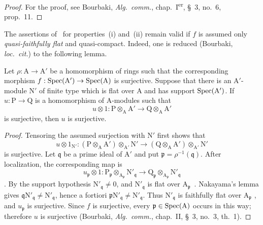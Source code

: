 \begin{proof}
For the proof, see Bourbaki, \emph{Alg.\ comm.}, chap.~I\textsuperscript{er}, \S~3, no.~6, prop.~11.
\end{proof}

\begin{remark}[2.5.4]
\label{IV.2.5.4}
The assertions of~ for properties~(i) and~(ii) remain
valid if $f$ is assumed only \emph{quasi-faithfully flat}
 and quasi-compact. Indeed, one is reduced (Bourbaki,
\emph{loc.\ cit.}) to the following lemma.
\end{remark}

\begin{lemma}[2.5.4.1]
\label{IV.2.5.4.1}
Let $\rho:\mathrm{A}\to\mathrm{A}'$ be a homomorphism of rings such that
the corresponding morphism
$f:\operatorname{Spec}(\mathrm{A}')\to\operatorname{Spec}(\mathrm{A})$ is surjective. Suppose that
there is an $\mathrm{A}'$-module $\mathrm{N}'$ of finite type which is
flat over $\mathrm{A}$ and has support $\operatorname{Spec}(\mathrm{A}')$. If
$u:\mathrm{P}\to\mathrm{Q}$ is a homomorphism of $\mathrm{A}$-modules
such that
\[
  u\otimes 1:
  \mathrm{P}\otimes_{\mathrm{A}}\mathrm{A}'
  \longrightarrow
  \mathrm{Q}\otimes_{\mathrm{A}}\mathrm{A}'
\]
is surjective, then $u$ is surjective.
\end{lemma}

\begin{proof}
Tensoring the assumed surjection with $\mathrm{N}'$ first shows that
\[
  u\otimes 1_{\mathrm{N}'}:
  (\mathrm{P}\otimes_{\mathrm{A}}\mathrm{A}')
    \otimes_{\mathrm{A}'}\mathrm{N}'
  \longrightarrow
  (\mathrm{Q}\otimes_{\mathrm{A}}\mathrm{A}')
    \otimes_{\mathrm{A}'}\mathrm{N}'
\]
is surjective. Let $\mathfrak{q}$ be a prime ideal of $\mathrm{A}'$ and
put $\mathfrak{p}=\rho^{-1}(\mathfrak{q})$. After localization, the
corresponding map is
\[
  u_{\mathfrak{p}}\otimes 1:
  \mathrm{P}_{\mathfrak{p}}
    \otimes_{\mathrm{A}_{\mathfrak{p}}}\mathrm{N}'_{\mathfrak{q}}
  \longrightarrow
  \mathrm{Q}_{\mathfrak{p}}
    \otimes_{\mathrm{A}_{\mathfrak{p}}}\mathrm{N}'_{\mathfrak{q}}
\]
. By the support hypothesis
$\mathrm{N}'_{\mathfrak{q}}\neq0$, and
$\mathrm{N}'_{\mathfrak{q}}$ is flat over
$\mathrm{A}_{\mathfrak{p}}$~. Nakayama's lemma gives
$\mathfrak{q}\mathrm{N}'_{\mathfrak{q}}\neq
\mathrm{N}'_{\mathfrak{q}}$, hence a fortiori
$\mathfrak{p}\mathrm{N}'_{\mathfrak{q}}\neq
\mathrm{N}'_{\mathfrak{q}}$. Thus $\mathrm{N}'_{\mathfrak{q}}$ is
faithfully flat over $\mathrm{A}_{\mathfrak{p}}$
, and $u_{\mathfrak{p}}$ is surjective. Since $f$ is
surjective, every $\mathfrak{p}\in\operatorname{Spec}(\mathrm{A})$ occurs in this way;
therefore $u$ is surjective (Bourbaki, \emph{Alg.\ comm.}, chap.~II,
\S~3, no.~3, th.~1).
\end{proof}

